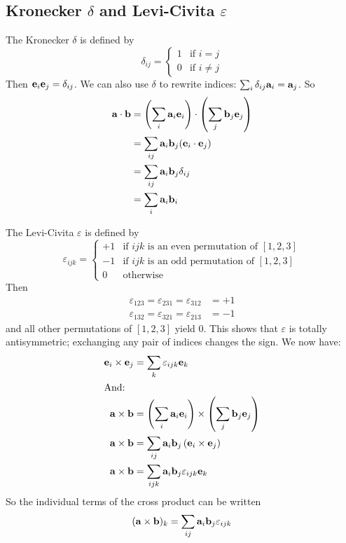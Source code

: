 \subsection{Kronecker \texorpdfstring{\( \delta \)}{𝛿} and Levi-Civita \texorpdfstring{\( \varepsilon \)}{𝜀}}
The Kronecker \(\delta\) is defined by
\[
	\delta_{ij} = \begin{cases}
		1 & \text{if } i = j    \\
		0 & \text{if } i \neq j
	\end{cases}
\]
Then \(\vb e_i \vb e_j = \delta_{ij}\).
We can also use \(\delta\) to rewrite indices: \(\sum_i \delta_{ij} \vb a_i = \vb a_j\).
So
\begin{align*}
	\vb a \cdot \vb b & = \left( \sum_i \vb a_i \vb e_i \right) \cdot \left( \sum_j \vb b_j \vb e_j \right) \\
	                  & = \sum_{ij} \vb a_i \vb b_j (\vb e_i \cdot \vb e_j)                                 \\
	                  & = \sum_{ij} \vb a_i \vb b_j \delta_{ij}                                             \\
	                  & = \sum_i \vb a_i \vb b_i
\end{align*}

The Levi-Civita \(\varepsilon\) is defined by
\[
	\varepsilon_{ijk} = \begin{cases}
		+1 & \text{if } ijk \text{ is an even permutation of } [1, 2, 3] \\
		-1 & \text{if } ijk \text{ is an odd permutation of } [1, 2, 3]  \\
		0  & \text{otherwise}
	\end{cases}
\]
Then
\begin{align*}
	\varepsilon_{123} = \varepsilon_{231} = \varepsilon_{312} & = +1 \\
	\varepsilon_{132} = \varepsilon_{321} = \varepsilon_{213} & = -1
\end{align*}
and all other permutations of \([1, 2, 3]\) yield 0.
This shows that \(\varepsilon\) is totally antisymmetric; exchanging any pair of indices changes the sign.
We now have:
\begin{align*}
	\vb e_i \times \vb e_j & = \sum_k \varepsilon_{ijk} \vb e_k                                                   \\
	\intertext{And:}
	\vb a \times \vb b     & = \left( \sum_i \vb a_i \vb e_i \right) \times \left( \sum_j \vb b_j \vb e_j \right) \\
	\vb a \times \vb b     & = \sum_{ij} \vb a_i \vb b_j \left( \vb e_i \times \vb e_j \right)                    \\
	\vb a \times \vb b     & = \sum_{ijk} \vb a_i \vb b_j \varepsilon_{ijk} \vb e_k
\end{align*}
So the individual terms of the cross product can be written
\[
	(\vb a \times \vb b)_k = \sum_{ij} \vb a_i \vb b_j \varepsilon_{ijk}
\]

